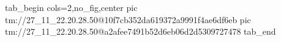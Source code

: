  
 
 
 
 

\qqSecOrig


\ifcmt
  tab_begin cols=2,no_fig,center
    pic tm://27_11_22.20.28.50@10f7cb352da619372a9991f4ae6df6eb
    pic tm://27_11_22.20.28.50@a2afee7491b52d6eb06d2d5309727478
  tab_end
\fi

